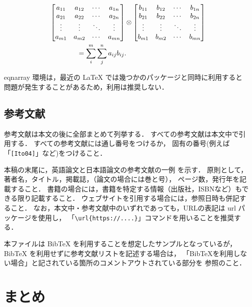 \documentclass[a4j,twocolumn]{ujarticle} %
\begin{document}
\begin{align}
	& \begin{bmatrix}
	a_{11} & a_{12} & \cdots & a_{1n} \\
	a_{21} & a_{22} & \cdots & a_{2n} \\
	\vdots & \vdots & \ddots & \vdots \\
	a_{m1} & a_{m2} & \cdots & a_{mn} \\
	\end{bmatrix}
	\otimes
	\begin{bmatrix}
	b_{11} & b_{12} & \cdots & b_{1n} \\
	b_{21} & b_{22} & \cdots & b_{2n} \\
	\vdots & \vdots & \ddots & \vdots \\
	b_{m1} & b_{m2} & \cdots & b_{mn} \\
	\end{bmatrix} \notag \\
	& \qquad \qquad = \sum_{i}^{m}\sum_{j}^{n}a_{ij}b_{ij} .
	\label{eq:samp2}
\end{align}

eqnarray 環境は，最近の LaTeX では幾つかのパッケージと同時に利用すると
問題が発生することがあるため，利用は推奨しない．

\subsection{参考文献}
参考文献は本文の後に全部まとめて列挙する．
すべての参考文献は本文中で引用する．
すべての参考文献には通し番号をつけるか，
固有の番号(例えば「\verb+[Ito04]+」など)をつけること．

本稿の末尾に，英語論文と日本語論文の参考文献の一例 \cite{Ito04}\cite{Abe10} を示す．
原則として，著者名，タイトル，掲載誌，（論文の場合には巻と号），
ページ数，発行年を記載すること．
書籍の場合には，書籍を特定する情報（出版社，ISBNなど）もできる限り記載すること\cite{Ito18}．
ウェブサイト\cite{ArtScience}を引用する場合には，参照日時も併記すること．
なお，本文中・参考文献中のいずれであっても，URLの表記は url パッケージを使用し，
「\verb+\url{https://....}+」コマンドを用いることを推奨する．

本ファイルは BibTeX を利用することを想定したサンプルとなっているが，
BibTeX を利用せずに参考文献リストを記述する場合は，
「BibTeXを利用しない場合」と記されている箇所のコメントアウトされている部分を
参照のこと．

\section{まとめ}
\end{document}
